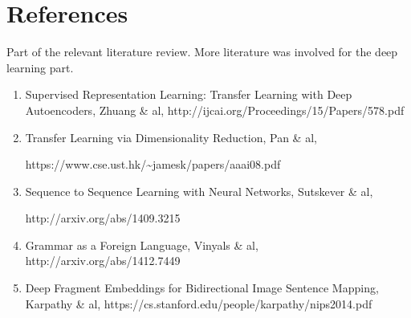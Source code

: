 \documentclass[12pt]{article}
\begin{document}
\section{References}\label{references}

Part of the relevant literature review. More literature was involved for
the deep learning part.

\begin{enumerate}
\def\labelenumi{\arabic{enumi}.}
\item
  Supervised Representation Learning: Transfer Learning with Deep
  Autoencoders, Zhuang \& al,
  http://ijcai.org/Proceedings/15/Papers/578.pdf
\item
  Transfer Learning via Dimensionality Reduction, Pan \& al,

  https://www.cse.ust.hk/\textasciitilde{}jamesk/papers/aaai08.pdf
\item
  Sequence to Sequence Learning with Neural Networks, Sutskever \& al,

  http://arxiv.org/abs/1409.3215
\item
  Grammar as a Foreign Language, Vinyals \& al,
  http://arxiv.org/abs/1412.7449
\item
  Deep Fragment Embeddings for Bidirectional Image Sentence Mapping,
  Karpathy \& al, https://cs.stanford.edu/people/karpathy/nips2014.pdf
\end{enumerate}

\end{document}
